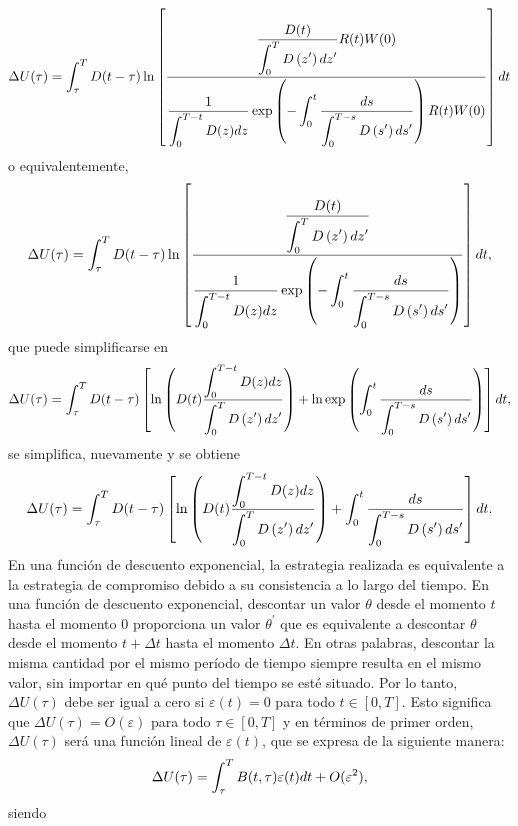 \begin{equation*}
    \begin{split}
    \Delta U(\tau)=\displaystyle \int_\tau^T D(t-\tau) \ln \left[\dfrac{\dfrac{D(t)}{\displaystyle \int_0^T D\left(z^{\prime}\right) d z^{\prime}}R(t) W(0) }{\dfrac{1}{\displaystyle \int_0^{T-t} D(z) d z} \exp \left(-\displaystyle \int_0^t \dfrac{d s}{\displaystyle \int_0^{T-s} D\left(s^{\prime}\right) d s^{\prime}}\right) R(t) W(0)}\right] dt 
    \end{split}
\end{equation*}
o equivalentemente,
\begin{equation}
\label{eq 58}
\Delta U(\tau)=\displaystyle \int_\tau^T D(t-\tau) \ln \left[\dfrac{\dfrac{D(t)}{\displaystyle \int_0^T D\left(z^{\prime}\right) d z^{\prime}}}{\dfrac{1}{\displaystyle \int_0^{T-t} D(z) d z} \exp \left(-\displaystyle \int_0^t \dfrac{d s}{\displaystyle \int_0^{T-s} D\left(s^{\prime}\right) d s^{\prime}}\right)}\right] dt,
\end{equation}
que puede simplificarse en
%
\begin{equation*}
\Delta U(\tau)=\displaystyle \int_\tau^T D(t-\tau)\left[\ln \left(D(t) \dfrac{\displaystyle \int_0^{T-t} D(z) d z}{\displaystyle \int_0^T D\left(z^{\prime}\right) d z^{\prime}}\right)+ \ln \exp \left(\displaystyle \int_0^t \dfrac{d s}{\displaystyle \int_0^{T-s} D\left(s^{\prime}\right) d s^{\prime}} \right) \right] dt,
\end{equation*}
%
se simplifica, nuevamente y se obtiene
\begin{equation}
\label{eq 59}
\Delta U(\tau)=\displaystyle \int_\tau^T D(t-\tau)\left[\ln \left(D(t) \dfrac{\displaystyle \int_0^{T-t} D(z) d z}{\displaystyle \int_0^T D\left(z^{\prime}\right) d z^{\prime}}\right)+\displaystyle \int_0^t \dfrac{d s}{\displaystyle \int_0^{T-s} D\left(s^{\prime}\right) d s^{\prime}}\right] d t.
\end{equation}
%
En una función de descuento exponencial, la estrategia realizada es equivalente a la estrategia de compromiso debido a su consistencia a lo largo del tiempo. En una función de descuento exponencial, descontar un valor $\theta$ desde el momento $t$ hasta el momento 0 proporciona un valor $\theta^{\prime}$ que es equivalente a descontar $\theta$ desde el momento $t + \Delta t$ hasta el momento $\Delta t$. En otras palabras, descontar la misma cantidad por el mismo período de tiempo siempre resulta en el mismo valor, sin importar en qué punto del tiempo se esté situado. Por lo tanto, $\Delta U(\tau)$ debe ser igual a cero si $\varepsilon(t) = 0$ para todo $t \in [0, T]$. Esto significa que $\Delta U(\tau) = O(\varepsilon)$ para todo $\tau \in [0, T]$ y en términos de primer orden, $\Delta U(\tau)$ será una función lineal de $\varepsilon(t)$, que se expresa de la siguiente manera:
%
\begin{equation}
\label{eq 60}
    \Delta U (\tau)= \displaystyle \int_\tau^T B(t,\tau) \varepsilon(t) dt + O(\varepsilon^2),
\end{equation}
%
siendo 

